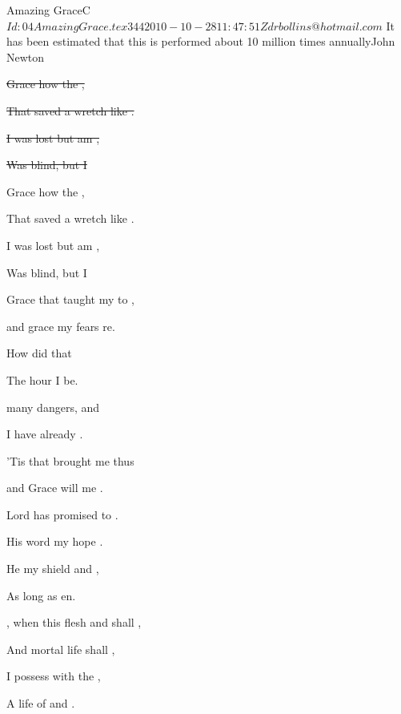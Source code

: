 \begin{SBSong}{Amazing Grace}{C}
    {$Id: 04AmazingGrace.tex 344 2010-10-28 11:47:51Z drbollins@hotmail.com $}
    {It has been estimated that this is performed about 10 million times annually}{John Newton}
  \begin{SBVerse}
    \sout{ Grace how  the ,}

    \sout{That saved a wretch like .}
    
    \sout{I  was lost but  am ,}

    \sout{Was blind, but  I }
  \end{SBVerse}
  \begin{SBVerse}
     Grace how  the ,

    That saved a wretch like .
    
    I  was lost but  am ,

    Was blind, but  I 
  \end{SBVerse}
  \begin{SBVerse}
 	 Grace that taught my  to ,

    and grace my fears re.

    How  did that  

    The hour I  be.
  \end{SBVerse}
  \begin{SBVerse}
     many dangers,  and 
    
    I have already .
    
    'Tis  that brought me  thus 
    
    and Grace will  me . 
  \end{SBVerse}
  \begin{SBVerse}
     Lord has promised  to .
    
    His word my hope .
    
    He  my shield and  ,
    
    As long as  en.
  \end{SBVerse}
  \begin{SBVerse}
    , when this flesh and  shall ,

    And mortal life shall ,

    I  possess with the ,

    A life of  and .
  \end{SBVerse}
\end{SBSong}

